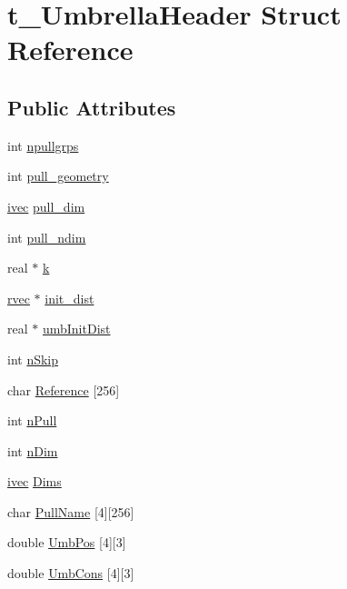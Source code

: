 \hypertarget{structt__UmbrellaHeader}{\section{t\-\_\-\-Umbrella\-Header \-Struct \-Reference}
\label{structt__UmbrellaHeader}
}
\subsection*{\-Public \-Attributes}
\begin{DoxyCompactItemize}
\item 
int \hyperlink{structt__UmbrellaHeader_aca7bae33a7f77c647dc39f17d4c34730}{npullgrps}
\item 
int \hyperlink{structt__UmbrellaHeader_ab7adfcc83ec1e3eab7fcafb9f9fed2fe}{pull\-\_\-geometry}
\item 
\hyperlink{share_2template_2gromacs_2types_2simple_8h_a74f6ffdb4a9c1764f5293969d8c681b6}{ivec} \hyperlink{structt__UmbrellaHeader_ade169342250ef46a156c03e5424c8ed2}{pull\-\_\-dim}
\item 
int \hyperlink{structt__UmbrellaHeader_a1900f98ed55750bed80f4181b34f771d}{pull\-\_\-ndim}
\item 
real $\ast$ \hyperlink{structt__UmbrellaHeader_a66d5deb0d2147fc5fb7d7dbd260a7c07}{k}
\item 
\hyperlink{share_2template_2gromacs_2types_2simple_8h_aa02a552a4abd2f180c282a083dc3a999}{rvec} $\ast$ \hyperlink{structt__UmbrellaHeader_a7c2e93bd4aab7e21a427709691150d3e}{init\-\_\-dist}
\item 
real $\ast$ \hyperlink{structt__UmbrellaHeader_acb2eaa424f7840e114ed030b6774138a}{umb\-Init\-Dist}
\item 
int \hyperlink{structt__UmbrellaHeader_ab5757bf1edda932cefea91ebbaa50a41}{n\-Skip}
\item 
char \hyperlink{structt__UmbrellaHeader_a4d49e2c056ad71973f24f42a7d21d3bf}{\-Reference} \mbox{[}256\mbox{]}
\item 
int \hyperlink{structt__UmbrellaHeader_a89d0684907533e446c14ae68fc43db22}{n\-Pull}
\item 
int \hyperlink{structt__UmbrellaHeader_a01b8e4be17eb1d9792161695ead9894e}{n\-Dim}
\item 
\hyperlink{share_2template_2gromacs_2types_2simple_8h_a74f6ffdb4a9c1764f5293969d8c681b6}{ivec} \hyperlink{structt__UmbrellaHeader_a7bb22fc69d831ce07a07b5337a677c4a}{\-Dims}
\item 
char \hyperlink{structt__UmbrellaHeader_a3cc1e5a7f79128da070f5ccc0bdebdd7}{\-Pull\-Name} \mbox{[}4\mbox{]}\mbox{[}256\mbox{]}
\item 
double \hyperlink{structt__UmbrellaHeader_a40ab99ebe9635119925247df13c4e5a3}{\-Umb\-Pos} \mbox{[}4\mbox{]}\mbox{[}3\mbox{]}
\item 
double \hyperlink{structt__UmbrellaHeader_a5270c65bb361a83c3c29d4e3bce65e1c}{\-Umb\-Cons} \mbox{[}4\mbox{]}\mbox{[}3\mbox{]}
\end{DoxyCompactItemize}


